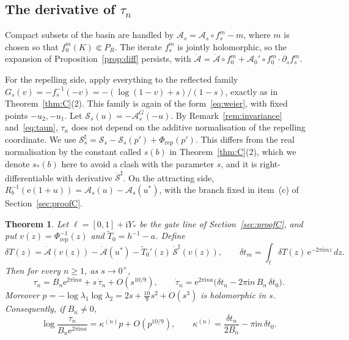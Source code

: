 \documentclass[11pt]{amsart}
\newtheorem{theorem}{Theorem}[section]
\theoremstyle{definition}
\newcommand{\Rr}{R}
\newcommand{\eee}{\mathrm{e}}
\newcommand{\ii}{\mathrm{i}}
\begin{document}
\subsection{The derivative of $\tau_n$}
Compact subsets of the basin are handled by
$\mathcal A_s=\mathcal A_s\circ f_s^m-m$, where $m$ is chosen so that
$f_0^m(K)\Subset P_R$.  The iterate $f_s^m$ is jointly holomorphic, so the
expansion of Proposition~\ref{prop:diff} persists, with
$\dot{\mathcal A}=\dot{\mathcal A}\circ f_0^m+\mathcal A_0'\circ f_0^m\cdot\partial_sf_s^m$.

For the repelling side, apply everything to the reflected family
$G_s(v)=-f_s^{-1}(-v)=-(\log(1-v)+s)/(1-s)$, exactly as in
Theorem~\ref{thm:C}(2).  This family is again of the form~\eqref{eq:weier},
with fixed points $-u_2,-u_1$.  Let $\mathcal S_s(u)=-\mathcal A^G_s(-u)$.  By
Remark~\ref{rem:invariance} and~\eqref{eq:taun}, $\tau_n$ does not depend on the
additive normalisation of the repelling coordinate.  We use
$\mathcal S^\sharp_s=\mathcal S_s-\mathcal S_s(p')+\Phi_{\mathrm{rep}}(p')$.
This differs from the real normalisation by the constant called
$s(b)$ in Theorem~\ref{thm:C}(2), which we denote $s_*(b)$ here to avoid a clash
with the parameter $s$, and it is right-differentiable with derivative
$\dot{\mathcal S}^\sharp$.  On the attracting side,
$\Rr_b^{-1}(\eee(1+u))=\mathcal A_s(u)-\mathcal A_s(u^*)$, with the branch fixed
in item~(c) of Section~\ref{sec:proofC}.

\begin{theorem}\label{thm:D}
Let $\ell=[0,1]+\ii Y_*$ be the gate line of Section~\ref{sec:proofC}, and put
$v(z)=\Phi_{\mathrm{rep}}^{-1}(z)$ and $\tilde T_0=h^{-1}-a$.  Define
\[
 \delta T(z)=\dot{\mathcal A}(v(z))-\dot{\mathcal A}(u^*)
 -\tilde T_0'(z)\,\dot{\mathcal S}^\sharp(v(z)),\qquad
 \delta t_m=\int_\ell\delta T(z)\,\eee^{-2\pi\ii mz}\,dz .
\]
Then for every $n\ge1$, as $s\to0^+$,
\[
 \tau_n=B_n\eee^{2\pi\ii na}+s\,\dot\tau_n+O(s^{10/9}),\qquad
 \dot\tau_n=\eee^{2\pi\ii na}\bigl(\delta t_n-2\pi\ii n\,B_n\,\delta t_0\bigr).
\]
Moreover $p=-\log\lambda_1\log\lambda_2=2s+\tfrac{10}9s^2+O(s^3)$ is
holomorphic in $s$.  Consequently, if $B_n\ne0$,
\[
 \log\frac{\tau_n}{B_n\eee^{2\pi\ii na}}=\kappa^{(n)}p+O(p^{10/9}),\qquad
 \kappa^{(n)}=\frac{\delta t_n}{2B_n}-\pi\ii n\,\delta t_0 .
\]
\end{theorem}
\end{document}

